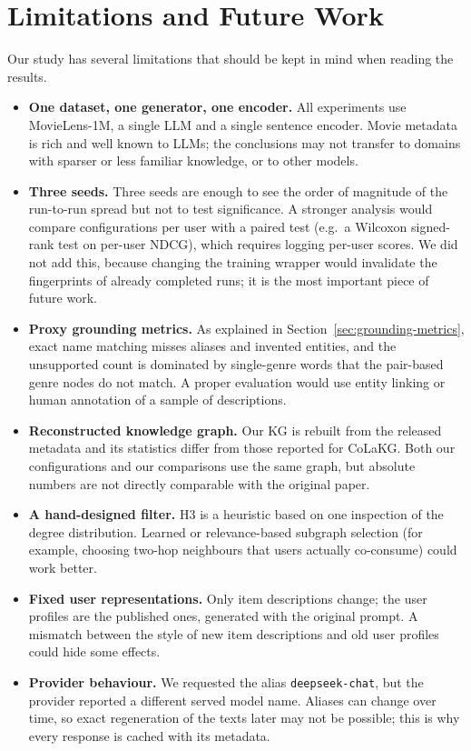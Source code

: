 \documentclass[a4paper,11pt]{article}
\begin{document}
\section{Limitations and Future Work}
\label{sec:limitations}
Our study has several limitations that should be kept in mind when reading the results.
\begin{itemize}
    \item \textbf{One dataset, one generator, one encoder.} All experiments use MovieLens-1M, a single LLM and a single sentence encoder. Movie metadata is rich and well known to LLMs; the conclusions may not transfer to domains with sparser or less familiar knowledge, or to other models.
    \item \textbf{Three seeds.} Three seeds are enough to see the order of magnitude of the run-to-run spread but not to test significance. A stronger analysis would compare configurations per user with a paired test (e.g.\ a Wilcoxon signed-rank test on per-user NDCG), which requires logging per-user scores. We did not add this, because changing the training wrapper would invalidate the fingerprints of already completed runs; it is the most important piece of future work.
    \item \textbf{Proxy grounding metrics.} As explained in Section~\ref{sec:grounding-metrics}, exact name matching misses aliases and invented entities, and the unsupported count is dominated by single-genre words that the pair-based genre nodes do not match. A proper evaluation would use entity linking or human annotation of a sample of descriptions.
    \item \textbf{Reconstructed knowledge graph.} Our KG is rebuilt from the released metadata and its statistics differ from those reported for CoLaKG. Both our configurations and our comparisons use the same graph, but absolute numbers are not directly comparable with the original paper.
    \item \textbf{A hand-designed filter.} H3 is a heuristic based on one inspection of the degree distribution. Learned or relevance-based subgraph selection (for example, choosing two-hop neighbours that users actually co-consume) could work better.
    \item \textbf{Fixed user representations.} Only item descriptions change; the user profiles are the published ones, generated with the original prompt. A mismatch between the style of new item descriptions and old user profiles could hide some effects.
    \item \textbf{Provider behaviour.} We requested the alias \texttt{deepseek-chat}, but the provider reported a different served model name. Aliases can change over time, so exact regeneration of the texts later may not be possible; this is why every response is cached with its metadata.

\end{itemize}
\end{document}
